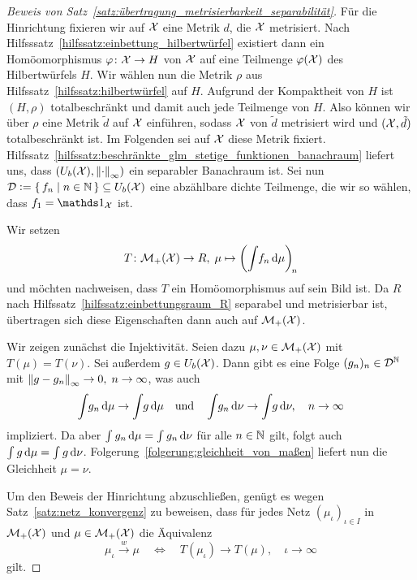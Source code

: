 \documentclass[../thesis/thesis.tex]{subfiles}
\begin{document}
	\begin{proof}[Beweis von Satz~\ref{satz:übertragung_metrisierbarkeit_separabilität}]
		Für die Hinrichtung fixieren wir auf $\mathcal{X}$ eine Metrik $d$, die $\mathcal{X}$ metrisiert. 
		Nach Hilfsssatz~\ref{hilfssatz:einbettung_hilbertwürfel} existiert dann ein Homöomorphismus $\varphi \colon \mathcal{X} \to H$ von
		$\mathcal{X}$ auf eine Teilmenge $\varphi(\mathcal{X})$ des Hilbertwürfels $H$. Wir wählen nun die Metrik $\rho$ aus Hilfssatz~\ref{hilfssatz:hilbertwürfel} auf $H$. Aufgrund der Kompaktheit von $H$ ist
		$(H, \rho)$ totalbeschränkt und damit auch jede Teilmenge von $H$. Also können wir über $\rho$ eine Metrik $\tilde{d}$ auf $\mathcal{X}$ einführen, sodass $\mathcal{X}$ von $\tilde{d}$ 
		metrisiert wird und $(\mathcal{X}, \tilde{d})$ totalbeschränkt ist. Im Folgenden sei auf $\mathcal{X}$ diese Metrik fixiert. Hilfssatz~\ref{hilfssatz:beschränkte_glm_stetige_funktionen_banachraum} liefert uns, dass 
		$(U_b(\mathcal{X}), \left\lVert\cdot\right\rVert_\infty)$ ein separabler Banachraum ist. Sei nun $\mathcal{D} \vcentcolon = \left\{\, f_n \; \middle| \; n \in \mathbb{N} \,\right\} \subseteq U_b(\mathcal{X})$ eine abzählbare dichte Teilmenge, 
		die wir so wählen, dass $f_1 = \indfct_\X$ ist.
		
		Wir setzen
		\[ T \colon \mathcal{M}_{+}(\mathcal{X}) \to R, \; \mu \mapsto \left( \int_{} \, f_n \, \mathrm{d}\mu \right)_{\! n}  \]
		und möchten nachweisen, dass $T$ ein Homöomorphismus auf sein Bild ist. Da $R$ nach Hilfssatz~\ref{hilfssatz:einbettungsraum_R} separabel und metrisierbar ist, übertragen sich diese Eigenschaften dann auch auf $\mathcal{M}_{+}(\mathcal{X})$.
		
		Wir zeigen zunächst die Injektivität. Seien dazu $\mu, \nu \in \mathcal{M}_{+}(\mathcal{X})$ mit $T(\mu) = T(\nu)$. 
		Sei außerdem $g \in U_b(\mathcal{X})$. Dann gibt es eine Folge $(g_n)_n \in \mathcal{D}^{\mathbb{N}}$ mit $\left\lVert g - g_n\right\rVert_\infty \to 0, \; n \to \infty$, was auch 
		\[ \int_{} \, g_n \, \mathrm{d}\mu \to \int_{} \, g \, \mathrm{d}\mu \quad \text{und} \quad \int_{} \, g_n \, \mathrm{d}\nu \to \int_{} \, g \, \mathrm{d}\nu, \quad n \to \infty \]
		impliziert. Da aber $\int_{} \, g_n \, \mathrm{d}\mu = \int_{} \, g_n \, \mathrm{d}\nu$ für alle $n \in \mathbb{N}$ gilt, folgt auch $\int_{} \, g \, \mathrm{d}\mu = \int_{} \, g \, \mathrm{d}\nu$.
		Folgerung~\ref{folgerung:gleichheit_von_maßen} liefert nun die Gleichheit $\mu = \nu$.
		
		Um den Beweis der Hinrichtung abzuschließen, genügt es wegen Satz~\ref{satz:netz_konvergenz} zu beweisen, dass für jedes Netz $(\mu_\iota)_{\iota \in I}$ in $\mathcal{M}_{+}(\mathcal{X})$ und $\mu \in \mathcal{M}_{+}(\mathcal{X})$ die
		Äquivalenz
		\[ \mu_\iota \xrightarrow{w} \mu \quad \iff \quad T(\mu_\iota) \to T(\mu), \quad \iota \to \infty  \]
		gilt.
		

\end{proof}
\end{document}
